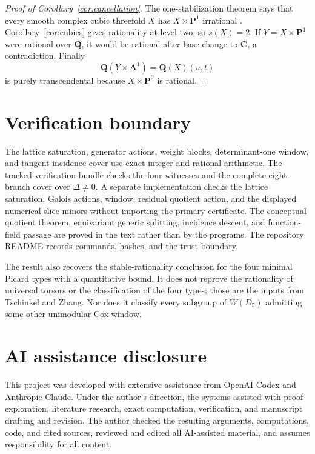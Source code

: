 \documentclass[11pt]{article}
\theoremstyle{remark}
\newcommand{\A}{\mathbf A}
\newcommand{\PP}{\mathbf P}
\begin{document}
\begin{proof}[Proof of Corollary~\ref{cor:cancellation}]
The one-stabilization theorem says that every smooth complex cubic
threefold \(X\) has \(X\times\PP^1\) irrational
\cite[Theorem~1.1]{RuddM1}.  Corollary~\ref{cor:cubics} gives rationality at
level two, so \(s(X)=2\).  If \(Y=X\times\PP^1\) were rational over
\(\mathbf Q\), it would be rational after base change to \(\mathbf C\), a
contradiction.  Finally
\[
 \mathbf Q(Y\times\A^1)=\mathbf Q(X)(u,t)
\]
is purely transcendental because \(X\times\PP^2\) is rational.
%
%
\end{proof}

\section{Verification boundary}

The lattice saturation, generator actions, weight blocks, determinant-one
window, and tangent-incidence cover use exact integer and rational arithmetic.
The tracked verification bundle checks the four witnesses and the complete
eight-branch cover over \(\Delta\ne0\).  A separate implementation checks the
lattice saturation, Galois actions, window, residual quotient action, and the
displayed numerical slice minors without importing the primary certificate.
The conceptual quotient theorem, equivariant generic splitting, incidence
descent, and function-field passage are proved in the text rather than by the
programs.  The repository README records commands, hashes, and the trust
boundary.

The result also recovers the stable-rationality conclusion for the four
minimal Picard types with a quantitative bound.  It does not reprove the
rationality of universal torsors or the classification of the four types;
those are the inputs from Tschinkel and Zhang.  Nor does it classify every
subgroup of \(W(D_5)\) admitting some other unimodular Cox window.

\section*{AI assistance disclosure}

This project was developed with extensive assistance from OpenAI Codex and
Anthropic Claude. Under the author's direction, the systems assisted with
proof exploration, literature research, exact computation, verification,
and manuscript drafting and revision. The author checked the resulting
arguments, computations, code, and cited sources, reviewed and edited all
AI-assisted material, and assumes responsibility for all content.
\end{document}
